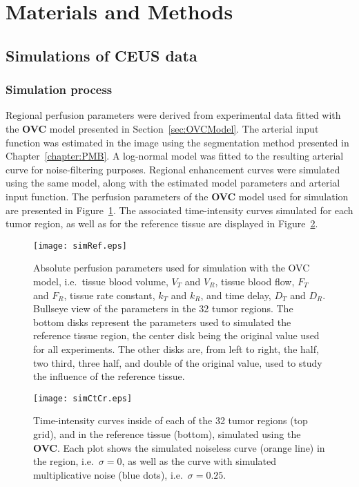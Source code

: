 \section{Materials and Methods}
\subsection{Simulations of CEUS data}
\subsubsection{Simulation process}
Regional perfusion parameters were derived from experimental data fitted with the \textbf{OVC} model presented in Section~\ref{sec:OVCModel}.
The arterial input function was estimated in the image using the segmentation method presented in Chapter~\ref{chapter:PMB}.
A log-normal model was fitted to the resulting arterial curve for noise-filtering purposes. 
Regional enhancement curves were simulated using the same model, along with the estimated model parameters and arterial input function.
The perfusion parameters of the \textbf{OVC} model used for simulation are presented in Figure~\ref{fig:simRef}.
The associated time-intensity curves simulated for each tumor region, as well as for the reference tissue are displayed in Figure~\ref{fig:simCtCr}.

\begin{figure}[bh]
\texttt{[image: simRef.eps]}
\caption{Absolute perfusion parameters used for simulation with the OVC model, i.e.~tissue blood volume, $V_T$ and $V_R$, tissue blood flow, $F_T$ and $F_R$, tissue rate constant, $k_T$ and $k_R$, and time delay, $D_T$ and $D_R$. Bullseye view of the parameters in the 32 tumor regions. The bottom disks represent the parameters used to simulated the reference tissue region, the center disk being the original value used for all experiments. The other disks are, from left to right, the half, two third, three half, and double of the original value, used to study the influence of the reference tissue.}
\label{fig:simRef}
\end{figure}

\begin{figure}
\texttt{[image: simCtCr.eps]}
\caption{Time-intensity curves inside of each of the 32 tumor regions (top grid), and in the reference tissue (bottom), simulated using the \textbf{OVC}. Each plot shows the simulated noiseless curve (orange line) in the region, i.e.~$\sigma = 0$, as well as the curve with simulated multiplicative noise (blue dots), i.e.~$\sigma = 0.25$.}
\label{fig:simCtCr}
\end{figure}

